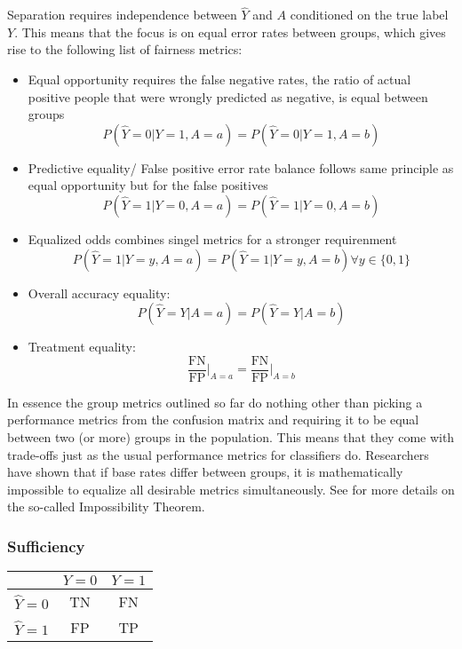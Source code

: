 Separation requires independence between $\hat{Y}$ and $A$ conditioned on the true label $Y$. This means that the focus is on equal error rates between groups, which gives rise to the following list of fairness metrics:
\begin{itemize}
    \item Equal opportunity requires the false negative rates, the ratio of actual positive people that were wrongly predicted as negative, is equal between groups $$P(\hat{Y} = 0 | Y = 1, A = a) = P(\hat{Y} = 0 | Y = 1, A = b)$$
    \item Predictive equality/ False positive error rate balance follows same principle as equal opportunity but for the false positives $$P(\hat{Y} = 1 | Y = 0, A = a) = P(\hat{Y} = 1 | Y = 0, A = b)$$
    \item Equalized odds combines singel metrics for a stronger requirenment $$P(\hat{Y} = 1 | Y = y, A = a) = P(\hat{Y} = 1 | Y = y, A = b) \forall y \in \{0, 1\}$$ 
    \item Overall accuracy equality: $$P(\hat{Y} = Y | A = a) = P(\hat{Y} = Y | A = b)$$ 
    \item Treatment equality: $$\frac{\text{FN}}{\text{FP}} \big|_{A = a} = \frac{\text{FN}}{\text{FP}} \big|_{A = b}$$
\end{itemize}

In essence the group metrics outlined so far do nothing other than picking a performance metrics from the confusion matrix and requiring it to be equal between two (or more) groups in the population.
This means that they come with trade-offs just as the usual performance metrics for classifiers do. Researchers have shown that if base rates differ between groups, it is mathematically impossible to equalize all desirable metrics simultaneously. See for more details on the so-called Impossibility Theorem.



\subsubsection*{Sufficiency}

\begin{center}
    \renewcommand{\arraystretch}{1.5}  %
    \begin{tabular}{|c|c|c|}
        \hline
        & \(Y = 0\) & \(Y = 1\) \\
        \hline
        \textbf{\(\hat{Y} = 0\)} & TN & FN \\
        \hline
        \textbf{\(\hat{Y} = 1\)} & FP & TP \\
        \hline
    \end{tabular}
    \label{tab:confusion_matrix_2}
\end{center}

